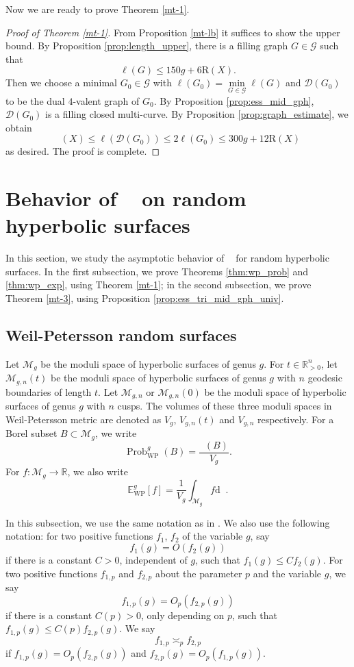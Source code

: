 \documentclass[UTF8]{amsart}
\numberwithin{equation}{section}
\theoremstyle{definition}
\theoremstyle{example}
\theoremstyle{remark}
\DeclareMathOperator{\prob}{Prob}
\DeclareMathOperator{\vol}{Vol_{WP}}
\DeclareMathOperator{\slfs}{\mathcal{L}_{sys}^{fill}}
\begin{document}
Now we are ready to prove Theorem \ref{mt-1}.
\begin{proof}[Proof of Theorem \ref{mt-1}]
From Proposition \ref{mt-lb} it suffices to show the upper bound. By Proposition \ref{prop:length_upper}, there is a filling graph $G \in \mathcal{G}$ such that $$\ell(G) \le 150g+6\mathrm{R}(X).$$ Then we choose a minimal $G_0 \in \mathcal{G}$ with $\ell(G_0) = \min\limits_{G\in \mathcal{G}}\ell(G)$ and $\mathcal{D}(G_0)$ to be the dual $4$-valent graph of $G_0$. By Proposition \ref{prop:ess_mid_gph}, $\mathcal{D}(G_0)$ is a filling closed multi-curve. By Proposition \ref{prop:graph_estimate}, we obtain 
	\[
		\slfs(X)\leq\ell(\mathcal{D}(G_0)) \le 2 \ell(G_0) \le 300g+12\mathrm{R}(X)
	\]
    as desired. The proof is complete.
\end{proof}

\section{Behavior of $\slfs$ on random hyperbolic surfaces}\label{s-rs}
In this section, we study the asymptotic behavior of $\slfs$ for random hyperbolic surfaces. In the first subsection, we prove Theorems \ref{thm:wp_prob} and \ref{thm:wp_exp}, using Theorem \ref{mt-1}; in the second subsection, we prove Theorem \ref{mt-3}, using Proposition \ref{prop:ess_tri_mid_gph_univ}.

\subsection{Weil-Petersson random surfaces} Let $\mathcal{M}_g$ be the moduli space of hyperbolic surfaces of genus $g$. For $t\in \mathbb{R}^n_{ > 0}$, let $\mathcal{M}_{g,n}(t)$ be the moduli space of hyperbolic surfaces of genus $g$ with $n$ geodesic boundaries of length $t$. Let $\mathcal{M}_{g,n}$ or $\mathcal{M}_{g,n}(0)$ be the moduli space of hyperbolic surfaces of genus $g$ with $n$ cusps. The volumes of these three moduli spaces in Weil-Petersson metric are denoted as $V_g$, $V_{g,n}(t)$ and $V_{g,n}$ respectively. 
For a Borel subset $B\subset \mathcal{M}_g$, we write 
\[
	\prob_{\mathrm{WP}}^g(B) = \frac{\vol(B)}{V_g}. 
\]
For $f: \mathcal{M}_g \to \mathbb{R}$, we also write
\[
	\mathbb{E}_{\mathrm{WP}}^{g}[f] = \frac{1}{V_g} \int_{\mathcal{M}_g} f \mathrm{d}\vol. 
\]


\noindent In this subsection, we use the same notation as in \cite{mirzakhani2013growth, WX22-GAFA, nie2023large}. We also use the following notation: for two positive functions $f_1$, $f_2$ of the variable $g$, say $$f_1(g) = O(f_2(g))$$ if there is a constant $C > 0$, independent of $g$, such that $f_1(g) \le C f_2(g)$. 
For two positive functions $f_{1,p}$ and $f_{2,p}$ about the parameter $p$ and the variable $g$, we say $$f_{1,p}(g) = O_p(f_{2,p}(g))$$ if there is a constant $C(p) > 0$, only depending on $p$, such that $f_{1,p}(g) \le C(p) f_{2,p}(g)$. We say $$f_{1,p}\asymp_p f_{2,p}$$ if $f_{1,p}(g) = O_p(f_{2,p}(g))$ and $f_{2,p}(g) = O_p(f_{1,p}(g))$. 
\end{document}
